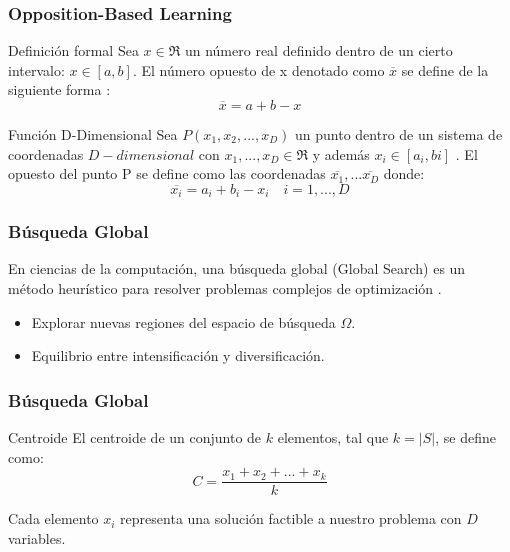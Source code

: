 \begin{frame}
\frametitle{Opposition-Based Learning}
\begin{block}{Definición formal}
Sea $x \in \Re $  un número real definido dentro de un cierto intervalo: $x \in [a,b]$. El número opuesto de x denotado como $\overline{x}$ se define de la siguiente forma \cite{obl}:
 \begin{equation}
     \overline{x} = a + b - x 
 \end{equation}
 \end{block}
 \begin{block}{Función D-Dimensional}
Sea $ P(x_{1}, x_{2},...,x_{D}) $ un punto dentro de un sistema de coordenadas $D-dimensional$ con $ x_{1},...,x_{D} \in \Re$ y además $ x_{i} \in [a_{i}, b{i}]$ \cite{obl}. El opuesto del punto P se define como las coordenadas $\overline{x_{1}},...\overline{x_{D}}$ donde:
\begin{equation}
    \overline{x_{i}} = a_{i} + b_{i} - x_{i} \quad i = 1,...,D 
\end{equation}
 \end{block}
\end{frame}

\begin{frame}
\frametitle{Búsqueda Global}
\begin{block}{}
En ciencias de la computación, una búsqueda global (Global Search) es un método heurístico para resolver problemas complejos de optimización \cite{GlobalSearch, GlobalSearch2, GlobalSearch3}.
 \end{block}
\begin{block}{}
\begin{itemize}
	\item Explorar nuevas regiones del espacio de búsqueda $\Omega$.
	\item Equilibrio entre intensificación y diversificación.
\end{itemize}
 \end{block}
\end{frame}

\begin{frame}
\frametitle{Búsqueda Global}
\begin{block}{Centroide}
El centroide de un conjunto de $k$ elementos, tal que $k = \left | S \right |$, se define como:
\begin{equation}
    C = \frac{x_{1} + x_{2} + ... + x_{k}}{k}
\end{equation}
 \end{block}
\begin{block}{}
Cada elemento $x_{i}$ representa una solución factible a nuestro problema con $D$ variables.
 \end{block}
\end{frame}

